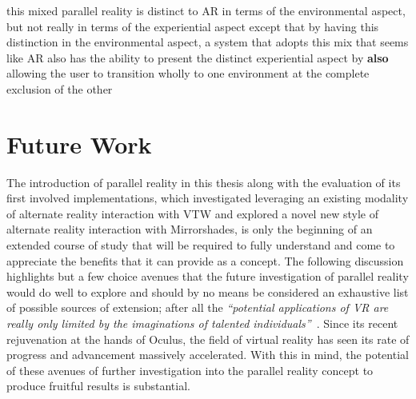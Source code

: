 this mixed parallel reality is distinct to AR in terms of the environmental aspect, but not really in terms of the experiential aspect
	except that by having this distinction in the environmental aspect, a system that adopts this mix that seems like AR also has the ability to present the distinct experiential aspect by \textbf{also} allowing the user to transition wholly to one environment at the complete exclusion of the other


\section{Future Work}

The introduction of parallel reality in this thesis along with the evaluation of its first involved implementations, which investigated leveraging an existing modality of alternate reality interaction with VTW and explored a novel new style of alternate reality interaction with Mirrorshades, is only the beginning of an extended course of study that will be required to fully understand and come to appreciate the benefits that it can provide as a concept. The following discussion highlights but a few choice avenues that the future investigation of parallel reality would do well to explore and should by no means be considered an exhaustive list of possible sources of extension; after all the \textit{``potential applications of VR are really only limited by the imaginations of talented individuals''}~\cite{Giuseppe2014a}. Since its recent rejuvenation at the hands of Oculus, the field of virtual reality has seen its rate of progress and advancement massively accelerated. With this in mind, the potential of these avenues of further investigation into the parallel reality concept to produce fruitful results is substantial.

